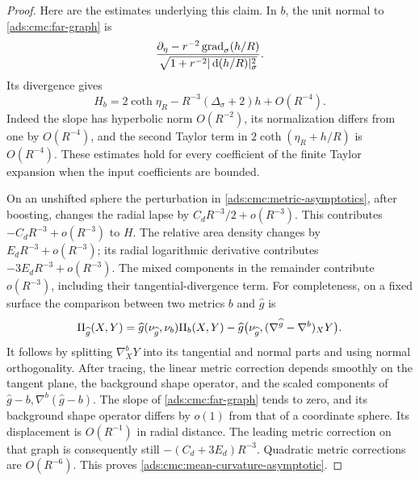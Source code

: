 \begin{proof}
Here are the estimates underlying this claim.
In \(b\), the unit normal to \eqref{ads:cmc:far-graph} is
\[
 \frac{\partial_\eta-r^{-2}\operatorname{grad}_\sigma(h/R)}
 {\sqrt{1+r^{-2}|\,\mathrm d(h/R)|_\sigma^2}}.
\]
Its divergence gives
\[
 H_b=2\coth\eta_R
       -R^{-3}(\Delta_\sigma+2)h+O(R^{-4}).
\]
Indeed the slope has hyperbolic norm \(O(R^{-2})\), its normalization
differs from one by \(O(R^{-4})\), and the second Taylor term in
\(2\coth(\eta_R+h/R)\) is \(O(R^{-4})\).
These estimates hold for every coefficient of the finite Taylor
expansion when the input coefficients are bounded.

On an unshifted sphere the perturbation in
\eqref{ads:cmc:metric-asymptotics}, after boosting, changes the radial
lapse by \(C_dR^{-3}/2+o(R^{-3})\).  This contributes
\(-C_dR^{-3}+o(R^{-3})\) to \(H\).
The relative area density changes by \(E_dR^{-3}+o(R^{-3})\);
its radial logarithmic derivative contributes
\(-3E_dR^{-3}+o(R^{-3})\).
The mixed components in the remainder contribute \(o(R^{-3})\),
including their tangential-divergence term.
For completeness, on a fixed surface the comparison between two
metrics \(b\) and \(\widehat g\) is
\[
 \mathrm{II}_{\widehat g}(X,Y)
 =\widehat g(\nu_{\widehat g},\nu_b)\mathrm{II}_b(X,Y)
 -\widehat g\bigl(\nu_{\widehat g},
       (\nabla^{\widehat g}-\nabla^b)_XY\bigr).
\]
It follows by splitting \(\nabla_X^bY\) into its tangential and normal
parts and using normal orthogonality.
After tracing, the linear metric correction depends smoothly on
the tangent plane, the background shape operator, and the scaled
components of \(\widehat g-b,\nabla^b(\widehat g-b)\).
The slope of \eqref{ads:cmc:far-graph} tends to zero, and its background
shape operator differs by \(o(1)\) from that of a coordinate sphere.
Its displacement is \(O(R^{-1})\) in radial distance.
The leading metric correction on that graph is consequently still
\(-(C_d+3E_d)R^{-3}\).
Quadratic metric corrections are \(O(R^{-6})\).
This proves \eqref{ads:cmc:mean-curvature-asymptotic}.


\end{proof}

